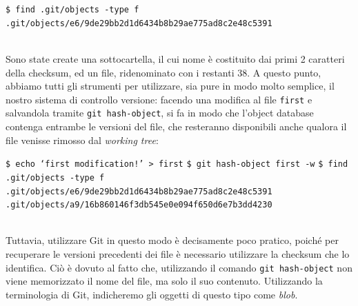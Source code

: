 \documentclass[12pt]{article}
\def\code#1{\texttt{#1}}
\def\minquote#1{`#1'}
\begin{document}
\begin{algorithm*}
	\begin{algorithmic}
		\State \code{\$ find .git/objects -type f}
		\State \code{.git/objects/e6/9de29bb2d1d6434b8b29ae775ad8c2e48c5391}	
	\end{algorithmic}
\end{algorithm*}
\bigskip \\
Sono state create una sottocartella, il cui nome è costituito dai primi 2 caratteri della checksum, ed un file, ridenominato con i restanti 38.
A questo punto, abbiamo tutti gli strumenti per utilizzare, sia pure in modo molto semplice, il nostro sistema di controllo versione: facendo una modifica al file \code{first} e salvandola tramite \code{git hash-object}, si fa in modo che l'object database contenga entrambe le versioni del file, che resteranno disponibili anche qualora il file venisse rimosso dal \textit{working tree}:
\begin{algorithm*}
	\begin{algorithmic}
		\State \code{\$ echo \minquote{first modification!} > first}
		\State \code{\$ git hash-object first -w}	
		\State \code{\$ find .git/objects -type f}
		\State \code{.git/objects/e6/9de29bb2d1d6434b8b29ae775ad8c2e48c5391}
		\State \code{.git/objects/a9/16b860146f3db545e0e094f650d6e7b3dd4230}
	\end{algorithmic}
\end{algorithm*}
\ \\Tuttavia, utilizzare Git in questo modo è decisamente poco pratico, poiché per recuperare le versioni precedenti dei file è necessario utilizzare la checksum che lo identifica. Ciò è dovuto al fatto che, utilizzando il comando \code{git hash-object} non viene memorizzato il nome del file, ma solo il suo contenuto. Utilizzando la terminologia di Git, indicheremo gli oggetti di questo tipo come \textit{blob}.
\end{document}
